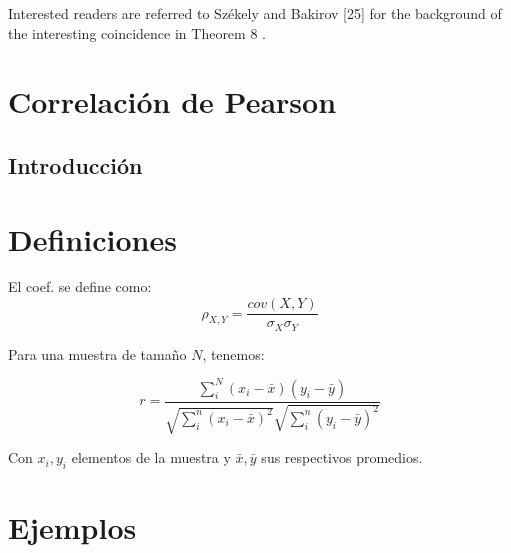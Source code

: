 	Interested readers are referred to Székely and Bakirov [25] for the background of the interesting coincidence in Theorem 8 .
\section[]{Correlaci\'on de Pearson}

	\subsection{Introducci\'on}

		
	 
	\section{Definiciones}
	
	El coef. se define como:
	\begin{equation}\label{pearson_orig}
		\rho_{X,Y}=\frac{cov(X,Y)}{\sigma_X\sigma_Y}
	\end{equation}
	
	Para una muestra de tama\~no $N$, tenemos:
	
	\begin{equation}\label{pearson_r}
		r=\frac{\sum_{i}^N\left(x_{i}-\bar{x}\right)\left(y_{i}-\bar{y}\right)}{\sqrt{\sum_{i}^n\left(x_{i}-\bar{x}\right)^{2}} \sqrt{\sum_{i}^n\left(y_{i}-\bar{y}\right)^{2}}}
	\end{equation}
	
	Con $x_i,y_i$ elementos de la muestra y $\bar{x},\bar{y}$ sus respectivos promedios.

\section{Ejemplos}


	\newpage